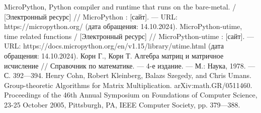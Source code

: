 \begin{thebibliography}{}
	  MicroPython, Python compiler and runtime that runs on the bare-metal. /  [Электронный ресурс] // MicroPython : [сайт]. — URL: https://micropython.org/ (дата обращения: 14.10.2024).
	 MicroPython-utime,  time related functions /  [Электронный ресурс] // MicroPython-utime : [сайт]. — URL: https://docs.micropython.org/en/v1.15/library/utime.html (дата обращения: 14.10.2024).
         Корн Г., Корн Т. Алгебра матриц и матричное исчисление // Справочник по математике. — 4-е издание. — М.: Наука, 1978. — С. 392—394.
         Henry Cohn, Robert Kleinberg, Balazs Szegedy, and Chris Umans. Group-theoretic Algorithms for Matrix Multiplication. arXiv:math.GR/0511460. Proceedings of the 46th Annual Symposium on Foundations of Computer Science, 23-25 October 2005, Pittsburgh, PA, IEEE Computer Society, pp. 379—388.
\end{thebibliography}